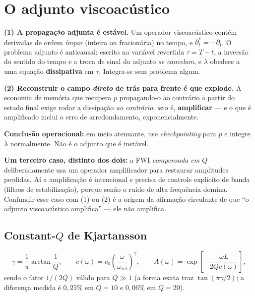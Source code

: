 \documentclass[11pt,a4paper,oneside]{report}
\begin{document}
\section{O adjunto viscoac\'ustico}
\label{sec:adjunto-visco3}

\begin{teoria}
\textbf{(1) A propaga\c{c}\~ao adjunta \'e est\'avel.} Um operador
viscoac\'ustico cont\'em derivadas de ordem \emph{\'impar} (inteira ou
fracion\'aria) no tempo, e $\partial_t^{*} = -\partial_t$. O problema adjunto
\'e anticausal: escrito na vari\'avel revertida $\tau = T-t$, a invers\~ao do
sentido do tempo e a troca de sinal do adjunto \emph{se cancelam}, e
$\lambda$ obedece a uma equa\c{c}\~ao \textbf{dissipativa} em $\tau$.
Integra-se sem problema algum.

\textbf{(2) Reconstruir o campo \emph{direto} de tr\'as para frente \'e que
explode.} A economia de mem\'oria que recupera $p$ propagando-o ao contr\'ario
a partir do estado final exige rodar a dissipa\c{c}\~ao \emph{ao contr\'ario},
isto \'e, \textbf{amplificar} --- e o que \'e amplificado inclui o erro de
arredondamento, exponencialmente.

\textbf{Conclus\~ao operacional:} em meio atenuante, use \emph{checkpointing}
para $p$ e integre $\lambda$ normalmente. N\~ao \'e o adjunto que \'e
inst\'avel.

\textbf{Um terceiro caso, distinto dos dois:} a FWI \emph{compensada em $Q$}
deliberadamente usa um operador amplificador para restaurar amplitudes
perdidas. A\'i a amplifica\c{c}\~ao \'e intencional e precisa de controle
expl\'icito de banda (filtros de estabiliza\c{c}\~ao), porque sen\~ao o
ru\'ido de alta frequ\^encia domina. Confundir esse caso com (1) ou (2) \'e a
origem da afirma\c{c}\~ao circulante de que ``o adjunto viscoac\'ustico
amplifica'' --- ele n\~ao amplifica.
\end{teoria}

\subsection*{Constant-$Q$ de Kjartansson}

\begin{equation}
\gamma = \frac{1}{\pi}\arctan\frac{1}{Q},
\qquad
c(\omega) = c_0\left(\frac{\omega}{\omega_{\text{ref}}}\right)^{\gamma},
\qquad
A(\omega) = \exp\!\left[-\frac{\omega L}{2Qc(\omega)}\right],
\end{equation}
sendo o fator $1/(2Q)$ v\'alido para $Q\gg1$ (a forma exata traz
$\tan(\pi\gamma/2)$; a diferen\c{c}a medida \'e $0{,}25\%$ em $Q=10$ e
$0{,}06\%$ em $Q=20$).
\end{document}
